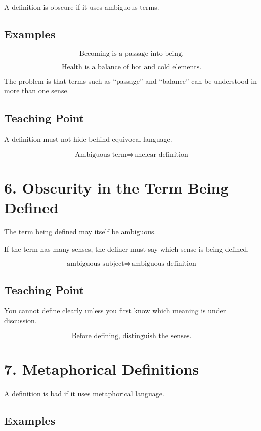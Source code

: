 \documentclass[12pt]{article}
\begin{document}
A definition is obscure if it uses ambiguous terms.

\subsection*{Examples}

\[
\text{Becoming is a passage into being.}
\]

\[
\text{Health is a balance of hot and cold elements.}
\]

The problem is that terms such as ``passage'' and ``balance'' can be understood
in more than one sense.

\subsection*{Teaching Point}

A definition must not hide behind equivocal language.

\[
\boxed{
\text{Ambiguous term} \Rightarrow \text{unclear definition}
}
\]

\section*{6. Obscurity in the Term Being Defined}

The term being defined may itself be ambiguous.

If the term has many senses, the definer must say which sense is being defined.

\[
\text{ambiguous subject} \Rightarrow \text{ambiguous definition}
\]

\subsection*{Teaching Point}

You cannot define clearly unless you first know which meaning is under
discussion.

\[
\boxed{
\text{Before defining, distinguish the senses.}
}
\]

\section*{7. Metaphorical Definitions}

A definition is bad if it uses metaphorical language.

\subsection*{Examples}
\end{document}
